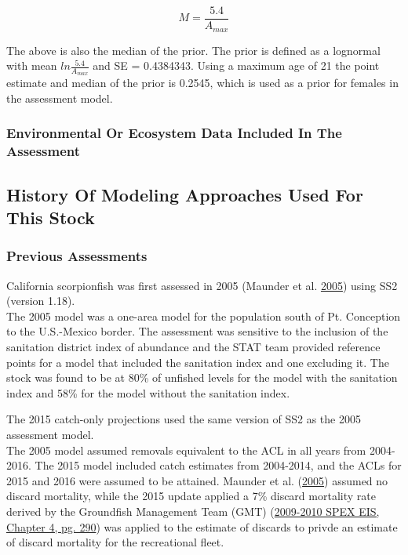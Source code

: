 \documentclass[12pt,]{article}
\begin{document}
\begin{equation}
M = \frac{5.4}{A_{max}}
\end{equation}

The above is also the median of the prior. The prior is defined as a
lognormal with mean \(ln\frac{5.4}{A_{max}}\) and SE = 0.4384343. Using
a maximum age of 21 the point estimate and median of the prior is
0.2545, which is used as a prior for females in the assessment model.

\vspace{.5cm}

\subsubsection{Environmental Or Ecosystem Data Included In The
Assessment}\label{environmental-or-ecosystem-data-included-in-the-assessment}

\subsection{History Of Modeling Approaches Used For This
Stock}\label{history-of-modeling-approaches-used-for-this-stock}

\subsubsection{Previous Assessments}\label{previous-assessments}

California scorpionfish was first assessed in 2005 (Maunder et al.
\protect\hyperlink{ref-Maunder2005}{2005}) using SS2 (version 1.18).\\
The 2005 model was a one-area model for the population south of Pt.
Conception to the U.S.-Mexico border. The assessment was sensitive to
the inclusion of the sanitation district index of abundance and the STAT
team provided reference points for a model that included the sanitation
index and one excluding it. The stock was found to be at 80\% of
unfished levels for the model with the sanitation index and 58\% for the
model without the sanitation index.

The 2015 catch-only projections used the same version of SS2 as the 2005
assessment model.\\
The 2005 model assumed removals equivalent to the ACL in all years from
2004-2016. The 2015 model included catch estimates from 2004-2014, and
the ACLs for 2015 and 2016 were assumed to be attained. Maunder et al.
(\protect\hyperlink{ref-Maunder2005}{2005}) assumed no discard
mortality, while the 2015 update applied a 7\% discard mortality rate
derived by the Groundfish Management Team (GMT)
(\href{http://www.pcouncil.org/wp-content/uploads/chp4_0910.pdf}{2009-2010
SPEX EIS, Chapter 4, pg. 290}) was applied to the estimate of discards
to privde an estimate of discard mortality for the recreational fleet.
\end{document}
